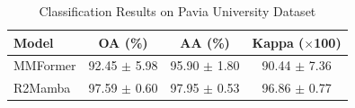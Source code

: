 \begin{table}[htbp]
\centering
\caption{Classification Results on Pavia University Dataset}
\label{tab:pavia university_results}
\begin{tabular}{lccc}
\toprule
Model & OA (\%) & AA (\%) & Kappa ($\times$100) \\
\midrule
MMFormer & 92.45 $\pm$ 5.98 & 95.90 $\pm$ 1.80 & 90.44 $\pm$ 7.36 \\
R2Mamba & 97.59 $\pm$ 0.60 & 97.95 $\pm$ 0.53 & 96.86 $\pm$ 0.77 \\
\bottomrule
\end{tabular}
\end{table}